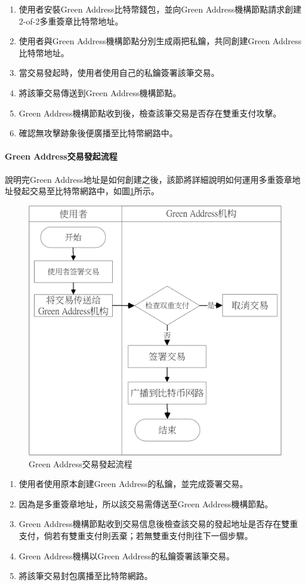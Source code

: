 		 	\begin{enumerate}
		 		\item 使用者安裝Green Address比特幣錢包，並向Green Address機構節點請求創建2-of-2多重簽章比特幣地址。
		 		\item 使用者與Green Address機構節點分別生成兩把私鑰，共同創建Green Address比特幣地址。
		 		\item 當交易發起時，使用者使用自己的私鑰簽署該筆交易。
		 		\item 將該筆交易傳送到Green Address機構節點。
		 		\item Green Address機構節點收到後，檢查該筆交易是否存在雙重支付攻擊。
		 		\item 確認無攻擊跡象後便廣播至比特幣網路中。
		 	\end{enumerate}

		 	\paragraph{Green Address交易發起流程}
		 	說明完Green Address地址是如何創建之後，該節將詳細說明如何運用多重簽章地址發起交易至比特幣網路中，如圖\ref{gatx}所示。

		 	\begin{figure}[h]
				\centering
				\includegraphics[width = .7\textwidth]{gatx.png}
				\caption{Green Address交易發起流程}\label{gatx}
			\end{figure}

			\begin{enumerate}
				\item 使用者使用原本創建Green Address的私鑰，並完成簽署交易。
				\item 因為是多重簽章地址，所以該交易需傳送至Green Address機構節點。
				\item Green Address機構節點收到交易信息後檢查該交易的發起地址是否存在雙重支付，倘若有雙重支付則丟棄；若無雙重支付則往下一個步驟。
				\item Green Address機構以Green Address的私鑰簽署該筆交易。
				\item 將該筆交易封包廣播至比特幣網路。
			\end{enumerate}

